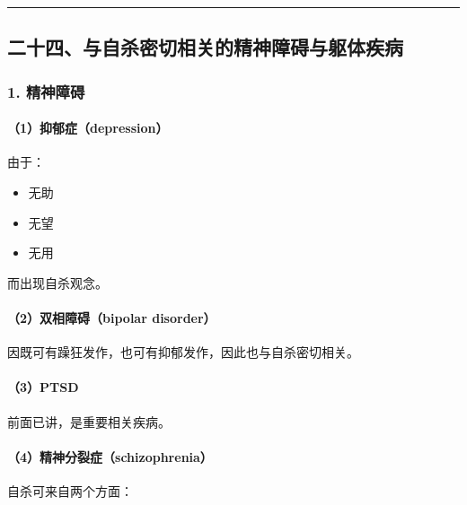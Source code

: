 \documentclass[
  chinese,
  9pt,
  a4paper,
]{ctexart}
\providecommand{\tightlist}{%
  \setlength{\itemsep}{0pt}\setlength{\parskip}{0pt}}
\begin{document}
\begin{center}\rule{0.5\linewidth}{0.5pt}\end{center}

\subsection{二十四、与自杀密切相关的精神障碍与躯体疾病}\label{ux4e8cux5341ux56dbux4e0eux81eaux6740ux5bc6ux5207ux76f8ux5173ux7684ux7cbeux795eux969cux788dux4e0eux8eafux4f53ux75beux75c5}

\subsubsection{1. 精神障碍}\label{ux7cbeux795eux969cux788d}

\paragraph{（1）抑郁症（depression）}\label{ux6291ux90c1ux75c7depression-1}

由于：

\begin{itemize}
\tightlist
\item
  无助
\item
  无望
\item
  无用
\end{itemize}

而出现自杀观念。

\paragraph{（2）双相障碍（bipolar
disorder）}\label{ux53ccux76f8ux969cux788dbipolar-disorder}

因既可有躁狂发作，也可有抑郁发作，因此也与自杀密切相关。

\paragraph{（3）PTSD}\label{ptsd}

前面已讲，是重要相关疾病。

\paragraph{（4）精神分裂症（schizophrenia）}\label{ux7cbeux795eux5206ux88c2ux75c7schizophrenia-1}

自杀可来自两个方面：
\end{document}
